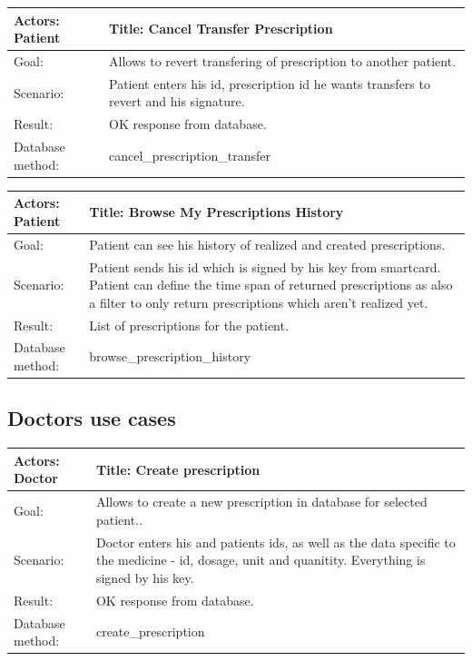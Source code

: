 \begin{table}[h]
    \begin{tabular}{| p{6cm} | p{7.75cm} |}
    \hline
    Actors: Patient &Title: Cancel Transfer Prescription \\ \hline
    Goal: & Allows to revert transfering of prescription to another patient. \\ \hline
    Scenario: & Patient enters his id, prescription id he wants transfers to revert and his signature. \\ \hline
    Result: & OK response from database. \\ \hline
    Database  method: & cancel\_prescription\_transfer \\ \hline
    \end{tabular}
\end{table}

\begin{table}[h]
    \begin{tabular}{| p{6cm} | p{7.75cm} |}
    \hline
    Actors: Patient &Title: Browse My Prescriptions History \\ \hline
    Goal: & Patient can see his history of realized and created prescriptions.\\ \hline
    Scenario: & Patient sends his id which is signed by his key from smartcard. Patient can define the time span of returned prescriptions as also a filter to only return prescriptions which aren't realized yet. \\ \hline
    Result: & List of prescriptions for the patient. \\ \hline
    Database  method: & browse\_prescription\_history \\ \hline
    \end{tabular}
\end{table}

\subsection{Doctors use cases}

\begin{table}[h]
    \begin{tabular}{| p{6cm} | p{7.75cm} |}
    \hline
   Actors:  Doctor &Title: Create prescription \\ \hline
    Goal: & Allows to create a new prescription in database for selected patient..\\ \hline
    Scenario: & Doctor enters his and patients ids, as well as the data specific to the medicine - id, dosage, unit and quanitity. Everything is signed by his key. \\ \hline
    Result: & OK response from database. \\ \hline
    Database  method: & create\_prescription \\ \hline
    \end{tabular}
\end{table}

